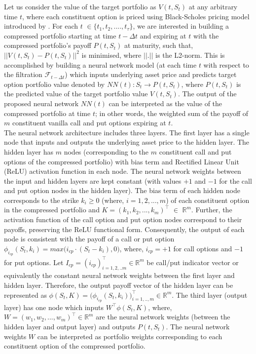 \noindent Let us consider the value of the target portfolio as $V(t, S_t)$ at any arbitrary time $t$, where each constituent option is priced using Black-Scholes pricing model introduced by \cite{black1973pricing}. For each $t$ $ \in \{t_1,t_2, ...., t_{\tau} \}$, we are interested in building a compressed portfolio starting at time $t - \Delta t$ and expiring at $t$ with the compressed portfolio's payoff $P(t, S_t)$ at maturity, such that, $||V(t, S_t) - P(t, S_t)||^{2}$ is minimised, where $||.||$ is the L2-norm. This is accomplished by building a neural network model (at each time $t$ with respect to the filtration $\mathcal{F}_{t - \Delta t}$) which inputs underlying asset price and predicts target option portfolio value denoted by $NN(t): S_t \rightarrow P(t, S_t)$, where $P(t, S_t)$ is the predicted value of the target portfolio value $V(t, S_t)$. The output of the proposed neural network $NN(t)$ can be interpreted as the value of the compressed portfolio at time $t$; in other words, the weighted sum of the payoff of $m$ constituent vanilla call and put options expiring at $t$.   \\

\noindent The neural network architecture includes three layers. The first layer has a single node that inputs and outputs the underlying asset price to the hidden layer. The hidden layer has $m$ nodes (corresponding to the $m$ constituent call and put options of the compressed portfolio) with bias term and Rectified Linear Unit (ReLU) activation function in each node. The neural network weights between the input and hidden layers are kept constant (with values $+1$ and $-1$ for the call and put option nodes in the hidden layer). The bias term of each hidden node corresponds to the strike $k_i \ge 0$ (where,  $i = 1, 2, ..., m$) of each constituent option in the compressed portfolio and $K = (k_1, k_2, ..., k_m)^{\intercal}$ $\in$ $\mathbb{R}^{m}$. Further, the activation function of the call option and put option nodes correspond to their payoffs, preserving the ReLU functional form. Consequently, the output of each node is consistent with the payoff of a call or put option $\phi_{i_{cp}}(S_{t}, k_i) = max\big( i_{cp} \cdot (S_{t} - k_i), 0 \big)$, where, $i_{cp} = +1$ for call options and $-1$ for put options. Let $I_{cp} = (i_{cp})^{\intercal}_{i=1,2,..m} \in \mathbb{R}^{m}$ be call/put indicator vector or equivalently the constant neural network weights between the first layer and hidden layer. Therefore, the output payoff vector of the hidden layer can be represented as $\phi(S_{t}, K) = \big(\phi_{i_{cp}}(S_{t}, k_i) \big)_{i=1, .., m}^{\intercal} \in \mathbb{R}^{m}$. The third layer (output layer) has one node which inputs $W^{\intercal} \phi(S_{t}, K)$, where, $W = (w_1, w_2, ..., w_m)^{\intercal} \in \mathbb{R}^{m}$ are the neural network weights (between the hidden layer and output layer) and outputs $P(t, S_t)$. The neural network weights $W$ can be interpreted as portfolio weights corresponding to each constituent option of the compressed portfolio. 

